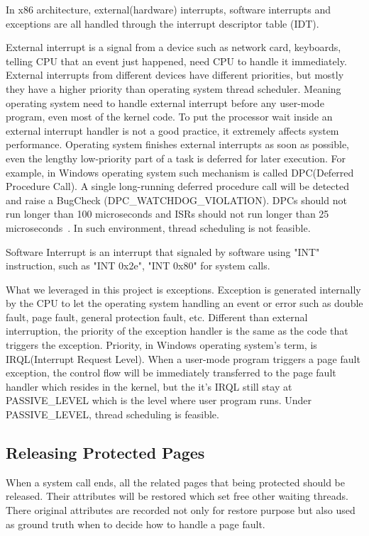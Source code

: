In x86 architecture, external(hardware) interrupts, software interrupts and exceptions are all handled through the interrupt descriptor table (IDT). 

External interrupt is a signal from a device such as network card, keyboards, telling CPU that an event just happened, need CPU to handle it immediately. External interrupts from different devices have different priorities, but mostly they have a higher priority than operating system thread scheduler. Meaning operating system need to handle external interrupt before any user-mode program, even most of the kernel code. To put the processor wait inside an external interrupt handler is not a good  practice, it extremely affects system performance. Operating system finishes external interrupts as soon as possible, even the lengthy low-priority part of a task is deferred for later execution. For example, in Windows operating system such mechanism is called DPC(Deferred Procedure Call). A single long-running deferred procedure call will be detected and raise a BugCheck (DPC\_WATCHDOG\_VIOLATION). DPCs should not run longer than 100 microseconds and ISRs should not run longer than 25 microseconds~\cite{msdnwatchdog}. In such environment, thread scheduling is not feasible.

Software Interrupt is an interrupt that signaled by software using "INT" instruction, such as "INT 0x2e", "INT 0x80" for system calls. 

What we leveraged in this project is exceptions. Exception is generated internally by the CPU to let the operating system handling an event or error such as double fault, page fault, general protection fault, etc. Different than external interruption, the priority of the exception handler is the same as the code that triggers the exception. Priority, in Windows operating system's term, is IRQL(Interrupt Request Level). When a user-mode program triggers a page fault exception, the control flow will be immediately transferred to the page fault handler which resides in the kernel, but the it's IRQL still stay at PASSIVE\_LEVEL which is the level where user program runs. Under PASSIVE\_LEVEL, thread scheduling is feasible.

\subsection{Releasing Protected Pages}

When a system call ends, all the related pages that being protected should be released. Their attributes will be restored which set free other waiting threads. There original attributes are recorded not only for restore purpose but also used as ground truth when to decide how to handle a page fault.


